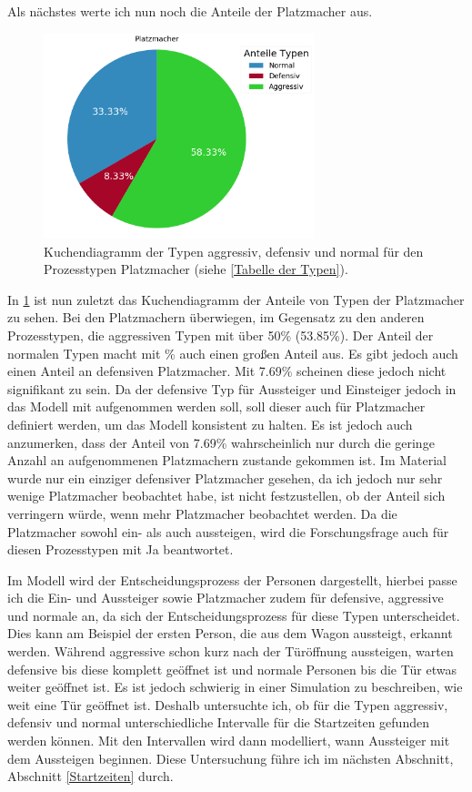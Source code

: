 Als nächstes werte ich nun noch die Anteile der Platzmacher aus.
\begin{figure}[H]
	\centering
		\includegraphics[width=0.7\textwidth]{pictures/data_evaluation/types/proportions_Platzmacher.png}
	\caption{Kuchendiagramm der Typen aggressiv, defensiv und normal für den Prozesstypen Platzmacher (siehe \ref{Tabelle der Typen}).}
	\label{fig:AnteileTypenPlatzmacher}
\end{figure}
In \figurename \ref{fig:AnteileTypenPlatzmacher} ist nun zuletzt das Kuchendiagramm der Anteile von Typen der Platzmacher zu sehen. Bei den Platzmachern überwiegen, im Gegensatz zu den anderen Prozesstypen, die aggressiven Typen mit über 50\% (53.85\%). Der Anteil der normalen Typen macht mit \%  auch einen großen Anteil aus. Es gibt jedoch auch einen Anteil an defensiven Platzmacher. Mit 7.69\% scheinen diese jedoch nicht signifikant zu sein. Da der defensive Typ für Aussteiger und Einsteiger jedoch in das Modell mit aufgenommen werden soll, soll dieser auch für Platzmacher definiert werden, um das Modell konsistent zu halten. Es ist jedoch auch anzumerken, dass der Anteil von 7.69\% wahrscheinlich nur durch die geringe Anzahl an aufgenommenen Platzmachern zustande gekommen ist. Im Material wurde nur ein einziger defensiver Platzmacher gesehen, da ich jedoch nur sehr wenige Platzmacher beobachtet habe, ist nicht festzustellen, ob der Anteil sich verringern würde, wenn mehr Platzmacher beobachtet werden. Da die Platzmacher sowohl ein- als auch aussteigen, wird die Forschungsfrage auch für diesen Prozesstypen mit Ja beantwortet. 

Im Modell wird der Entscheidungsprozess der Personen dargestellt, hierbei passe ich die Ein- und Aussteiger sowie Platzmacher zudem für defensive, aggressive und normale an, da sich der Entscheidungsprozess für diese Typen unterscheidet. Dies kann am Beispiel der ersten Person, die aus dem Wagon aussteigt, erkannt werden. Während aggressive schon kurz nach der Türöffnung aussteigen, warten defensive bis diese komplett geöffnet ist und normale Personen bis die Tür etwas weiter geöffnet ist. Es ist jedoch schwierig in einer Simulation zu beschreiben, wie weit eine Tür geöffnet ist. Deshalb untersuchte ich, ob für die Typen aggressiv, defensiv und normal unterschiedliche Intervalle für die Startzeiten gefunden werden können. Mit den Intervallen wird dann modelliert, wann Aussteiger mit dem Aussteigen beginnen. Diese Untersuchung führe ich im nächsten Abschnitt, Abschnitt \ref{Startzeiten} durch.

